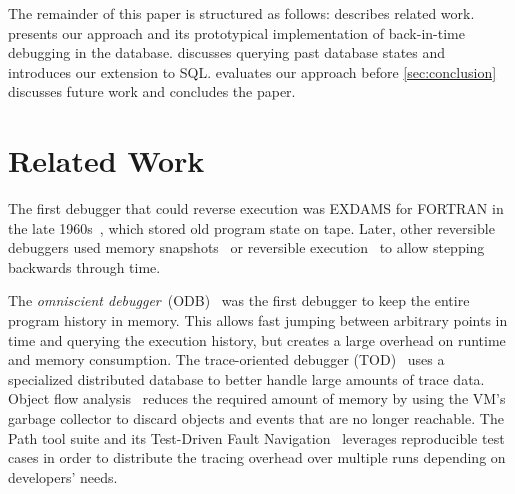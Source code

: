 \documentclass[english,conference]{IEEEtran}
\begin{document}
The remainder of this paper is structured as follows:
 describes related work. 
 presents our approach and its prototypical implementation of back-in-time debugging in the database.
 discusses querying past database states and introduces our extension to SQL.
 evaluates our approach before \cref{sec:conclusion} discusses future work and concludes the paper.


\section{Related Work}
\label{sec:relatedWork}

The first debugger that could reverse execution was EXDAMS for FORTRAN in the late 1960s~\cite{balzer_exdams:_1969}, which stored old program state on tape.
Later, other reversible debuggers used memory snapshots~\cite{feldman_igor:_1988} or reversible execution~\cite{lieberman1997zstep} to allow stepping backwards through time.

The \emph{omniscient debugger}~(ODB)~\cite{lewis_debugging_2003} was the first debugger to keep the entire program history in memory.
This allows fast jumping between arbitrary points in time and querying the execution history, but creates a large overhead on runtime and memory consumption.
The trace-oriented debugger (TOD)~\cite{pothier_scalable_2007} uses a specialized distributed database to better handle large amounts of trace data.
Object  flow  analysis~\cite{lienhard_practical_2008} reduces the required amount of memory by using the VM's garbage collector to discard objects and events that are no longer reachable.
The Path tool suite and its Test-Driven Fault Navigation~\cite{perscheid2013} leverages reproducible test cases in order to distribute the tracing overhead over multiple runs depending on developers' needs. 

\end{document}
